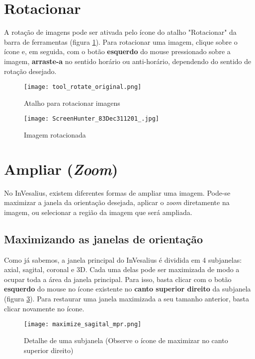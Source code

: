 \section{Rotacionar}

A rotação de imagens pode ser ativada pelo ícone do atalho "Rotacionar" da barra de ferramentas (figura
\ref{fig:rot_icon}). Para rotacionar uma imagem, clique sobre o ícone e, em seguida, com o botão
\textbf{esquerdo} do mouse pressionado sobre a imagem, \textbf{arraste-a} no sentido horário ou
anti-horário, dependendo do sentido de rotação desejado.

\begin{figure}[!htb]
\centering
\texttt{[image: tool\_rotate\_original.png]}
\caption{Atalho para rotacionar imagens}
\label{fig:rot_icon}
\end{figure}

\begin{figure}[!htb]
\centering
\texttt{[image: ScreenHunter\_83Dec311201\_.jpg]}
\caption{Imagem rotacionada}
\label{fig:rotate_all}
\end{figure}

\section{Ampliar (\textit{Zoom})}

No InVesalius, existem diferentes formas de ampliar uma imagem. Pode-se maximizar a janela da
orientação desejada, aplicar o \textit{zoom} diretamente na imagem, ou selecionar a região da imagem
que será ampliada.


\subsection{Maximizando as janelas de orientação}

Como já sabemos, a janela principal do InVesalius é dividida em 4 subjanelas: axial, sagital, coronal
e 3D. Cada uma delas pode ser maximizada de modo a ocupar toda a área da janela principal. Para isso,
basta clicar com o botão \textbf{esquerdo} do mouse no ícone existente no \textbf{canto superior direito}
da subjanela (figura \ref{fig:maximize_window}). Para restaurar uma janela maximizada a seu tamanho
anterior, basta clicar novamente no ícone.

\begin{figure}[!htb]
\centering
\texttt{[image: maximize\_sagital\_mpr.png]}
\caption{Detalhe de uma subjanela (Observe o ícone de maximizar no canto superior direito)}
\label{fig:maximize_window}
\end{figure}

